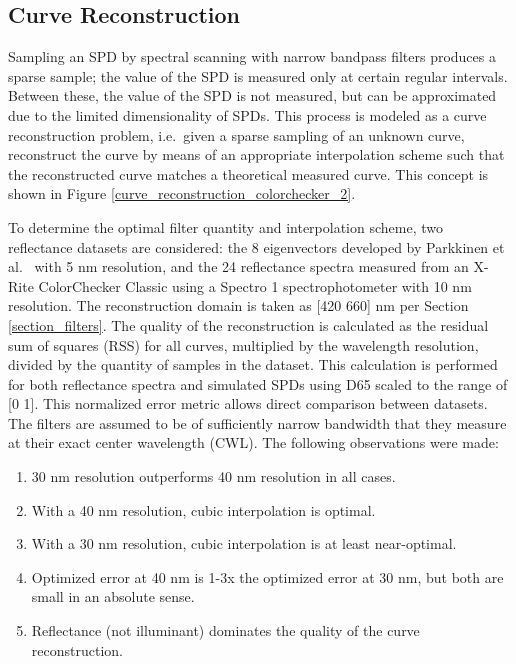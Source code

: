 \documentclass[twocolumn,10pt]{asme2ej}
\newcommand{\id}{\hspace{6 mm}}
\begin{document}
\subsection{Curve Reconstruction}
\label{curve_reconstruction}

Sampling an SPD by spectral scanning with narrow bandpass filters produces a sparse sample; the value of the SPD is measured only at certain regular intervals. Between these, the value of the SPD is not measured, but can be approximated due to the limited dimensionality of SPDs. This process is modeled as a curve reconstruction problem, i.e.\ given a sparse sampling of an unknown curve, reconstruct the curve by means of an appropriate interpolation scheme such that the reconstructed curve matches a theoretical measured curve. This concept is shown in Figure \ref{curve_reconstruction_colorchecker_2}.

\id To determine the optimal filter quantity and interpolation scheme, two reflectance datasets are considered: the 8 eigenvectors developed by Parkkinen et al.\ \cite{Parkkinen} with 5 nm resolution, and the 24 reflectance spectra measured from an X-Rite ColorChecker Classic \cite{X-Rite} using a Spectro 1 spectrophotometer with 10 nm resolution. The reconstruction domain is taken as [420 660] nm per Section \ref{section_filters}. The quality of the reconstruction is calculated as the residual sum of squares (RSS) for all curves, multiplied by the wavelength resolution, divided by the quantity of samples in the dataset. This calculation is performed for both reflectance spectra and simulated SPDs using D65 scaled to the range of [0 1]. This normalized error metric allows direct comparison between datasets. The filters are assumed to be of sufficiently narrow bandwidth that they measure at their exact center wavelength (CWL). The following observations were made:

\begin{enumerate}
  \item 30 nm resolution outperforms 40 nm resolution in all cases.
  \item With a 40 nm resolution, cubic interpolation is optimal.
  \item With a 30 nm resolution, cubic interpolation is at least near-optimal.
  \item Optimized error at 40 nm is 1-3x the optimized error at 30 nm, but both are small in an absolute sense.
  \item Reflectance (not illuminant) dominates the quality of the curve reconstruction.
\end{enumerate}
\end{document}
